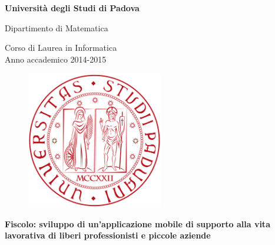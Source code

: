 \documentclass[12pt]{article}
\begin{document}
\begin{titlepage}
\begin{center}

\begin{LARGE}
\textbf{Università degli Studi di Padova} \\
\end{LARGE}

\vspace{10pt}

\begin{large}
Dipartimento di Matematica \\
\end{large}

\vspace{10pt}

\begin{large}
Corso di Laurea in Informatica \\
Anno accademico 2014-2015
\end{large}

\vspace{20pt}

\begin{figure}[htbp]
\begin{center}
\includegraphics[height=6cm]{images/logo-unipd.png}
\end{center}
\end{figure}

\vspace{0pt}

\begin{LARGE}
\begin{center}
\textbf{Fiscolo: sviluppo di un'applicazione mobile di supporto alla vita lavorativa di liberi professionisti e piccole aziende}
\end{center}
\end{LARGE}

\vspace{15pt}


\end{center}
\end{titlepage}
\end{document}
